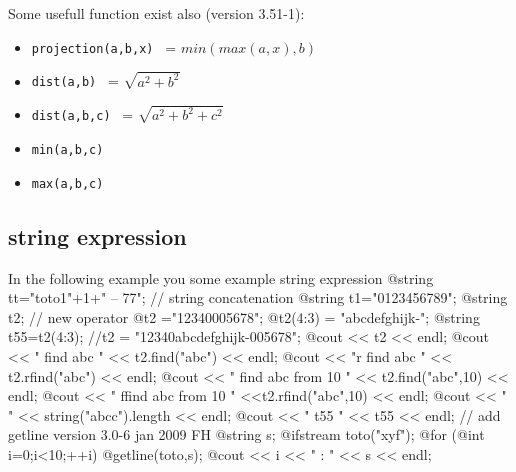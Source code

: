 \documentclass[a4paper,twoside,12pt]{book}
\begin{document}
Some usefull function exist also (version 3.51-1): 
\begin{itemize}
\item \verb!projection(a,b,x) ! = $min(max(a,x),b)$
\item \verb!dist(a,b) ! = $\sqrt{a^2+b^2}$
\item \verb!dist(a,b,c) ! = $\sqrt{a^2+b^2+c^2}$
\item \verb!min(a,b,c) ! 
\item \verb!max(a,b,c) ! 
\end{itemize}

\subsection{string expression}
In the following example you some example string expression 
\bFF
@string tt="toto1"+1+" -- 77"; // string concatenation   
@string t1="0123456789";
@string t2;
// new operator
@t2 ="12340005678";
@t2(4:3) = "abcdefghijk-"; 
@string t55=t2(4:3);
//t2 = "12340abcdefghijk-005678";
@cout << t2 << endl;
@cout << "  find abc " << t2.find("abc") << endl;
@cout << "r find abc " << t2.rfind("abc") << endl;
@cout << " find abc from 10  " << t2.find("abc",10) << endl;
@cout << " ffind abc from 10 " <<t2.rfind("abc",10) << endl;
@cout << "   " << string("abcc").length << endl; 
@cout << " t55 " << t55 << endl;
{  // add getline version 3.0-6 jan 2009 FH
@string s;
@ifstream toto("xyf");
@for (@int i=0;i<10;++i)
  {
   @getline(toto,s);
   @cout << i << " : " << s << endl;
  }
}
\eFF
\end{document}
